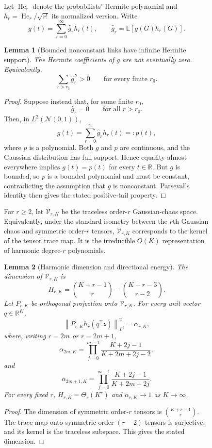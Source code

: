 \documentclass{article}
\newtheorem{lemma}[lemma]{Lemma}
\begin{document}
\begin{figure}
Let $\operatorname{He}_r$ denote the probabilists' Hermite polynomial and
$h_r=\operatorname{He}_r/\sqrt{r!}$ its normalized version. Write
\[
    g(t)=\sum_{r=0}^\infty\widehat g_r h_r(t),
    \qquad
    \widehat g_r=\mathbb E[g(G)h_r(G)].
\]


\begin{lemma}[Bounded nonconstant links have infinite Hermite support]
\label{lem:infinite-hermite-support}
\label{lem:clipped-ramp-hermite}
The Hermite coefficients of $g$ are not eventually zero. Equivalently,
\[
    \sum_{r>r_0}\widehat g_r^{\,2}>0
    \qquad\text{for every finite }r_0.
\]
\end{lemma}

\begin{proof}
Suppose instead that, for some finite $r_0$,
\[
    \widehat g_r=0
    \qquad\text{for all }r>r_0.
\]
Then, in $L^2(\mathcal N(0,1))$,
\[
    g(t)=\sum_{r=0}^{r_0}\widehat g_rh_r(t)=:p(t),
\]
where $p$ is a polynomial. Both $g$ and $p$ are continuous, and the Gaussian
distribution has full support. Hence equality almost everywhere implies
$g(t)=p(t)$ for every $t\in\mathbb R$. But $g$ is bounded, so $p$ is a
bounded polynomial and must be constant, contradicting the assumption that
$g$ is nonconstant. Parseval's identity then gives the stated positive-tail
property.
\end{proof}


For $r\geq2$, let $\mathcal V_{r,K}$ be the traceless order-$r$ Gaussian-chaos
space. Equivalently, under the standard isometry between the $r$th Gaussian
chaos and symmetric order-$r$ tensors, $\mathcal V_{r,K}$ corresponds to the
kernel of the tensor trace map. It is the irreducible $O(K)$ representation
of harmonic degree-$r$ polynomials.

\begin{lemma}[Harmonic dimension and directional energy]
\label{lem:harmonic-order-r}
The dimension of $\mathcal V_{r,K}$ is
\[
    H_{r,K}
    =\binom{K+r-1}{r}-\binom{K+r-3}{r-2}.
\]
Let $P_{r,K}$ be orthogonal projection onto $\mathcal V_{r,K}$. For every
unit vector $q\in\mathbb R^K$,
\[
    \left\|P_{r,K}h_r(q^\top z)\right\|_{L^2}^2
    =\alpha_{r,K},
\]
where, writing $r=2m$ or $r=2m+1$,
\[
    \alpha_{2m,K}
    =\prod_{j=0}^{m-1}
      \frac{K+2j-1}{K+2m+2j-2},
\]
and
\[
    \alpha_{2m+1,K}
    =\prod_{j=0}^{m-1}
      \frac{K+2j-1}{K+2m+2j}.
\]
For every fixed $r$, $H_{r,K}=\Theta_r(K^r)$ and
$\alpha_{r,K}\to1$ as $K\to\infty$.
\end{lemma}

\begin{proof}
The dimension of symmetric order-$r$ tensors is
$\binom{K+r-1}{r}$. The trace map onto symmetric order-$(r-2)$ tensors is
surjective, and its kernel is the traceless subspace. This gives the stated
dimension.


\end{proof}
\end{figure}
\end{document}
